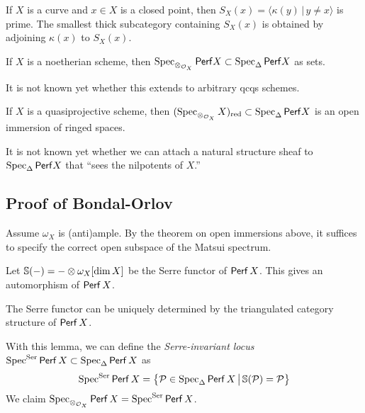 \documentclass{amsart}
\begin{document}
\begin{ex}
	If $X$ is a curve and $x \in X$ is a closed point, then $S_X(x) = \langle\kappa(y) \,|\, y \neq x\rangle$ is prime.
	The smallest thick subcategory containing $S_X(x)$ is obtained by adjoining $\kappa(x)$ to $S_X(x)$.
\end{ex}

\begin{prop}[Matsui]
	If $X$ is a noetherian scheme, then $\operatorname{Spec}_{\otimes_{\mathcal{O}_X}} \mathsf{Perf} X \subset \operatorname{Spec}_\Delta \mathsf{Perf} X$ as sets.
\end{prop}

\begin{rmk}
	It is not known yet whether this extends to arbitrary qcqs schemes.
\end{rmk}

\begin{thm}
	If $X$ is a quasiprojective scheme, then $(\operatorname{Spec}_{\otimes_{\mathcal{O}_X}} X)_{\mathrm{red}} \subset \operatorname{Spec}_\Delta \mathsf{Perf} X$ is an open immersion of ringed spaces.
\end{thm}

\begin{rmk}
	It is not known yet whether we can attach a natural structure sheaf to $\operatorname{Spec}_\Delta \mathsf{Perf} X$ that ``sees the nilpotents of $X$.''
\end{rmk}

\subsection{Proof of Bondal-Orlov}

Assume $\omega_X$ is (anti)ample.
By the theorem on open immersions above, it suffices to specify the correct open subspace of the Matsui spectrum.

Let $\mathbb{S}(-) = - \otimes \omega_X[\dim X]$ be the Serre functor of $\mathsf{Perf}\, X$.
This gives an automorphism of $\mathsf{Perf}\, X$.

\begin{lem}
	The Serre functor can be uniquely determined by the triangulated category structure of $\mathsf{Perf}\, X$.
\end{lem}

With this lemma, we can define the \emph{Serre-invariant locus} $\operatorname{Spec}^{\mathrm{Ser}} \mathsf{Perf}\, X \subset \operatorname{Spec}_\Delta \mathsf{Perf}\, X$ as 
\[
	\operatorname{Spec}^{\mathrm{Ser}} \mathsf{Perf}\, X = \big\{ \mathcal{P} \in \operatorname{Spec}_\Delta \mathsf{Perf}\, X \,\big|\, \mathbb{S}(\mathcal{P}) = \mathcal{P} \big\}
\]
We claim $\operatorname{Spec}_{\otimes_{\mathcal{O}_X}} \mathsf{Perf}\, X = \operatorname{Spec}^{\mathrm{Ser}} \mathsf{Perf}\, X$.
\end{document}
